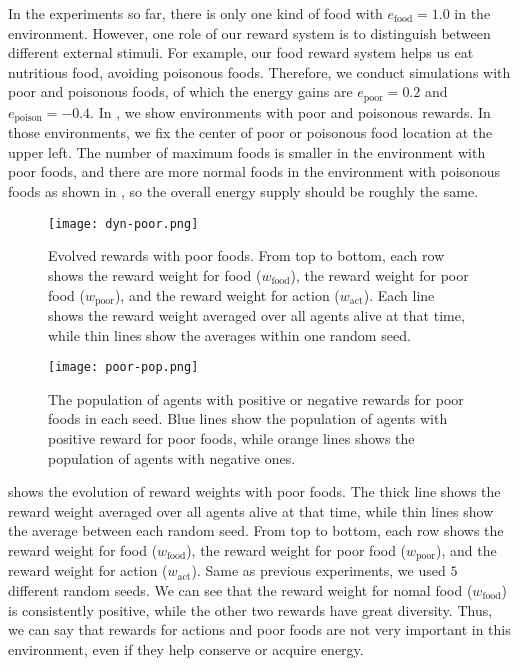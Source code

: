 In the experiments so far, there is only one kind of food with $e_{\mathrm{food}} = 1.0$ in the environment. However, one role of our reward system is to distinguish between different external stimuli. For example, our food reward system helps us eat nutritious food, avoiding poisonous foods. Therefore, we conduct simulations with poor and poisonous foods, of which the energy gains are $e_{\mathrm{poor}} = 0.2$ and $e_{\mathrm{poison}} = -0.4$. In , we show environments with poor and poisonous rewards. In those environments, we fix the center of poor or poisonous food location at the upper left. The number of maximum foods is smaller in the environment with poor foods, and there are more normal foods in the environment with poisonous foods as shown in , so the overall energy supply should be roughly the same.

\begin{figure}[t]
  \centering
  \texttt{[image: dyn-poor.png]}
  \caption{
    Evolved rewards with poor foods.
    From top to bottom, each row shows the reward weight for food ($w_{\mathrm{food}}$), the reward weight for poor food ($w_{\mathrm{poor}}$), and the reward weight for action ($w_{\mathrm{act}}$).
    Each line shows the reward weight averaged over all agents alive at that time, while thin lines show the averages within one random seed.
  }\label{figure:result-poor}
\end{figure}

\begin{figure}[t]
  \centering
  \texttt{[image: poor-pop.png]}
  \caption{
    The population of agents with positive or negative rewards for poor foods in each seed.
    Blue lines show the population of agents with positive reward for poor foods, while orange lines shows the population of agents with negative ones.
  }\label{figure:pop-poor}
\end{figure}

 shows the evolution of reward weights with poor foods. The thick line shows the reward weight averaged over all agents alive at that time, while thin lines show the average between each random seed. From top to bottom, each row shows the reward weight for food ($w_{\mathrm{food}}$), the reward weight for poor food ($w_{\mathrm{poor}}$), and the reward weight for action ($w_{\mathrm{act}}$). Same as previous experiments, we used $5$ different random seeds. We can see that the reward weight for nomal food ($w_{\mathrm{food}}$) is consistently positive, while the other two rewards have great diversity. Thus, we can say that rewards for actions and poor foods are not very important in this environment, even if they help conserve or acquire energy.

